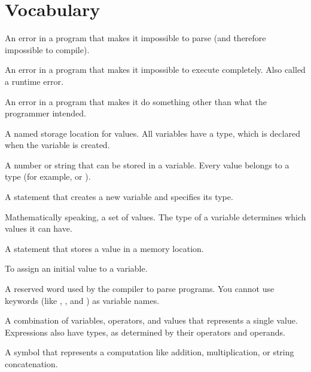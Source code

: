 \section{Vocabulary}

\begin{description}

An error in a program that makes it impossible to parse (and therefore impossible to compile).


An error in a program that makes it impossible to execute completely.
Also called a runtime error.

An error in a program that makes it do something other than what the programmer intended.

A named storage location for values.
All variables have a type, which is declared when the variable is created.

A number or string that can be stored in a variable.
Every value belongs to a type (for example,  or ).

A statement that creates a new variable and specifies its type.

Mathematically speaking, a set of values.
The type of a variable determines which values it can have.

A statement that stores a value in a memory location.



To assign an initial value to a variable.

A reserved word used by the compiler to parse programs.
You cannot use keywords (like , , and ) as variable names.

A combination of variables, operators, and values that represents a single value.  Expressions also have types, as determined by their operators and operands.

A symbol that represents a computation like addition, multiplication, or string concatenation.


\end{description}
